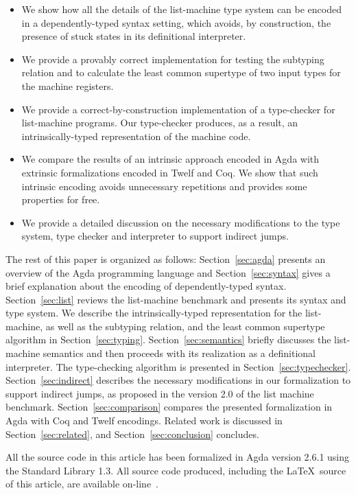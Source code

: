 \documentclass[review]{elsarticle}
\theoremstyle{definition}
\begin{document}
\begin{itemize}
  \item We show how all the details of the list-machine type system
        can be encoded in a dependently-typed syntax setting, which avoids, by construction,
        the presence of stuck states in its definitional interpreter.
  \item We provide a provably correct implementation for testing the subtyping
        relation and to calculate the least common supertype of two input
        types for the machine registers.
  \item We provide a correct-by-construction implementation of a type-checker for
        list-machine programs. Our type-checker produces, as a result, an intrinsically-typed
        representation of the machine code.
  \item We compare the results of an intrinsic approach encoded in Agda with extrinsic
        formalizations encoded in Twelf and Coq. We show that such intrinsic encoding avoids
        unnecessary repetitions and provides some properties for free.
  \item We provide a detailed discussion on the necessary modifications to the type system,
        type checker and interpreter to support indirect jumps.
\end{itemize}

The rest of this paper is organized as follows: Section~\ref{sec:agda} presents an overview of
the Agda programming language and Section~\ref{sec:syntax}
gives a brief explanation about the encoding of dependently-typed syntax. Section~\ref{sec:list}
reviews the list-machine benchmark and presents its syntax and type system.
We describe the intrinsically-typed representation for the list-machine, as well as
the subtyping relation, and the least common supertype algorithm in Section~\ref{sec:typing}.
Section~\ref{sec:semantics} briefly discusses the list-machine semantics and
then proceeds with its realization as a definitional interpreter.
The type-checking algorithm is presented in Section~\ref{sec:typechecker}.
Section~\ref{sec:indirect} describes the necessary modifications in our formalization to
support indirect jumps, as proposed in the version 2.0 of the list machine benchmark.
Section~\ref{sec:comparison}
compares the presented formalization in Agda with Coq and Twelf encodings. Related work is
discussed in Section~\ref{sec:related}, and Section~\ref{sec:conclusion} concludes.

All the source code in this article has been formalized in Agda
version 2.6.1 using the Standard Library 1.3. All source code produced,
including the \LaTeX~source of this article, are available
on-line~\cite{list-rep}.
\end{document}
